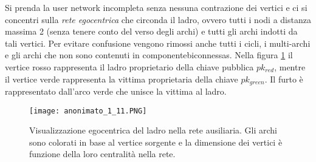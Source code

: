 Si prenda la user network incompleta senza nessuna contrazione dei vertici e ci si concentri sulla \emph{rete egocentrica} che circonda il ladro, ovvero tutti i nodi a distanza massima 2 (senza tenere conto del verso degli archi) e tutti gli archi indotti da tali vertici. Per evitare confusione vengono rimossi anche tutti i cicli, i multi-archi e gli archi che non sono contenuti in \glspl{componentebiconnessa}. Nella figura \ref{anonimato_1_11} il vertice rosso rappresenta il ladro proprietario della chiave pubblica $pk_{red}$, mentre il vertice verde rappresenta la vittima proprietaria della chiave $pk_{green}$. Il furto è rappresentato dall'arco verde che unisce la vittima al ladro.

\begin{figure}[htbp]
\centering
\texttt{[image: anonimato\_1\_11.PNG]}
\caption[Rete egocentrica di un furto]{Visualizzazione egocentrica del ladro nella rete ausiliaria. Gli archi sono colorati in base al vertice sorgente e la dimensione dei vertici è funzione della loro centralità nella rete.\label{anonimato_1_11}}
\end{figure}


